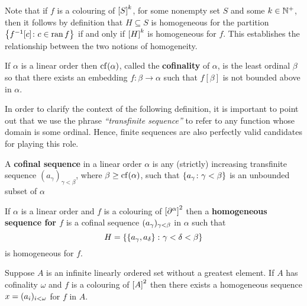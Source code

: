 \begin{rem}[Homogeneity]\label{rem:hom}
	Note that if $f$ is a colouring of $\subsets{k}{S}$, for some nonempty set
	$S$ and some $k\in\posnats$, then it follows by definition that $H\subseteq
	S$ is homogeneous for the partition $\setbuild{f^{-1}[c]}{c\in\range f}$ if
	and only if $\subsets{k}{H}$ is homogeneous for $f$.  This establishes the
	relationship between the two notions of homogeneity.
\end{rem}


\begin{dfn}[Cofinality]
	If $\alpha$ is a linear order then $\cf(\alpha)$, called the
	\textbf{cofinality} of $\alpha$, is the least ordinal $\beta$ so that there
	exists an embedding $f\colon\beta\to\alpha$ such that $f[\beta]$ is not
	bounded above in $\alpha$.
\end{dfn}

In order to clarify the context of the following definition, it is important to
point out that we use the phrase \textit{``transfinite sequence''} to refer to
any function whose domain is some ordinal.  Hence, finite sequences are also
perfectly valid candidates for playing this role.

\begin{dfn}
	A \textbf{cofinal sequence} in a linear order $\alpha$ is any (strictly)
	increasing transfinite sequence $(a_\gamma)_{\gamma<\beta}$, where
	$\beta\geq\cf(\alpha)$, such that $\setbuild{a_\gamma}{\gamma<\beta}$ is an
	unbounded subset of $\alpha$
\end{dfn}

\begin{dfn}
	If $\alpha$ is a linear order and $f$ is a colouring of
	$\subsets{2}{\domain\alpha}$ then a \textbf{homogeneous sequence for $f$}
	is a cofinal sequence $\family{a_\gamma}{\gamma<\beta}$ in $\alpha$ such
	that
	\begin{equation}
		H=\setbuild{\set{a_\gamma,a_\delta}}{\gamma<\delta<\beta}
	\end{equation}
	is homogeneous for $f$.
\end{dfn}

\begin{cor}\label{cor:Cofinal}
	Suppose $A$ is an infinite linearly ordered set without a greatest element.
	If $A$ has cofinality $\omega$ and $f$ is a colouring of $\subsets{2}{A}$
	then there exists a homogeneous sequence $x=\family{a_i}{i<\omega}$ for $f$
	in $A$.
\end{cor}

